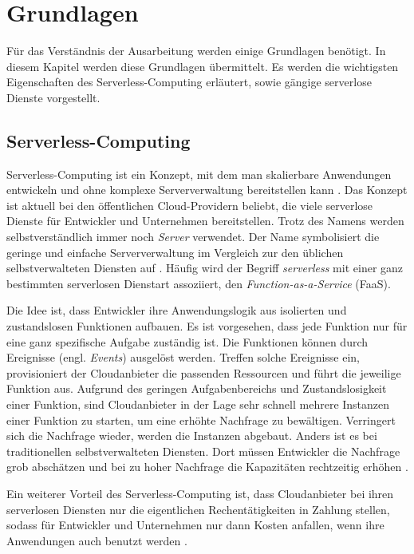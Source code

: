 \chapter{Grundlagen}
Für das Verständnis der Ausarbeitung werden einige Grundlagen benötigt.
In diesem Kapitel werden diese Grundlagen übermittelt.
Es werden die wichtigsten Eigenschaften des Serverless-Computing erläutert,
sowie gängige serverlose Dienste vorgestellt.

\section{Serverless-Computing}
Serverless-Computing ist ein Konzept, mit dem man skalierbare Anwendungen
entwickeln und ohne komplexe Serververwaltung bereitstellen kann \cite{CioGov}.
Das Konzept ist aktuell bei den öffentlichen Cloud-Providern beliebt, die viele
serverlose Dienste für Entwickler und Unternehmen bereitstellen. Trotz des Namens
werden selbstverständlich immer noch \textit{Server} verwendet. Der Name symbolisiert die geringe
und einfache Serververwaltung im Vergleich zur den üblichen selbstverwalteten
Diensten auf \cite{CNCF}.
Häufig wird der Begriff \textit{serverless} mit einer ganz bestimmten serverlosen Dienstart
assoziiert, den \textit{Function-as-a-Service} (FaaS).

Die Idee ist, dass Entwickler ihre Anwendungslogik aus isolierten und 
zustandslosen Funktionen aufbauen. Es ist vorgesehen, dass jede Funktion nur für eine
ganz spezifische Aufgabe zuständig ist. Die Funktionen können
durch Ereignisse (engl. \textit{Events}) ausgelöst werden. Treffen solche Ereignisse ein,
provisioniert der Cloudanbieter die passenden Ressourcen und führt die jeweilige Funktion aus.
Aufgrund des geringen Aufgabenbereichs und Zustandslosigkeit einer Funktion,
sind Cloudanbieter in der Lage sehr schnell mehrere Instanzen einer Funktion zu starten,
um eine erhöhte Nachfrage zu bewältigen.
Verringert sich die Nachfrage wieder, werden die Instanzen abgebaut. Anders ist 
es bei traditionellen selbstverwalteten Diensten. Dort müssen Entwickler die Nachfrage grob
abschätzen und bei zu hoher Nachfrage die Kapazitäten rechtzeitig
erhöhen \cite{WhatIsServerless} \cite{DBLP:journals/corr/BaldiniCCCFIMMR17}.

Ein weiterer Vorteil des Serverless-Computing ist, dass Cloudanbieter
bei ihren serverlosen Diensten nur die eigentlichen Rechentätigkeiten
in Zahlung stellen, sodass für Entwickler und Unternehmen nur dann Kosten
anfallen, wenn ihre Anwendungen auch benutzt werden \cite{EcoArc}.

